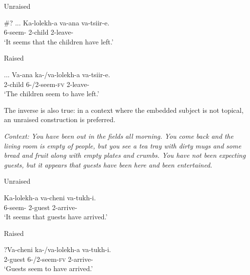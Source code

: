 \documentclass[output=paper,colorlinks,citecolor=brown
]{langscibook}
\begin{document}
\begin{xlist}

\ex\label{ex:johnson:UnraisedTopicalSubj}
{{Unraised}}

\gll \#? ... Ka-lolekh-a va-ana va-tsiir-e.\\
{} {} 6\Sm{}-seem-\Fv{} 2-child 2\Sm-leave-\Pst{}  \\
\glt `It seems that the children have left.'

\ex
{{Raised}}

\gll ... Va-ana ka-/va-lolekh-a va-tsiir-e.\\
{} 2-child 6\Sm-/2\Sm-seem-\textsc{fv} 2\Sm-leave-\Pst{} \\
\glt `The children seem to have left.'

\end{xlist}

\z


The inverse is also true: in a context where the embedded subject is not topical, an unraised construction is preferred.

\ea\label{ex:johnson:UnexpectedGuests}

\textit{Context: You have been out in the fields all morning. You come back and the living room is empty of people, but you see a tea tray with dirty mugs and some bread and fruit along with empty plates and crumbs. You have not been expecting guests, but it appears that guests have been here and been entertained.}

\begin{xlist}

\ex\label{ex:johnson:UnraisedGuests}
{{Unraised}}

\gll Ka-lolekh-a va-cheni va-tukh-i.\\
6\Sm-seem-\Fv{} 2-guest 2\Sm-arrive-\Pst{}\\
\glt `It seems that guests have arrived.'

\ex\label{ex:johnson:RaisedGuests}
{{Raised}}

\gll ?Va-cheni ka-/va-lolekh-a va-tukh-i.\\
2-guest 6\Sm-/2\Sm-seem-\textsc{fv} 2\Sm-arrive-\Pst{} \\
\glt `Guests seem to have arrived.'


\end{xlist}
\end{document}
